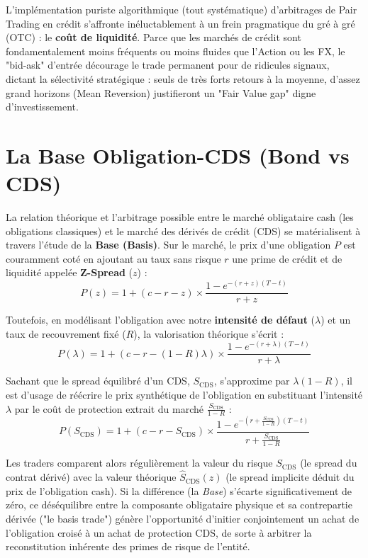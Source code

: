 L'implémentation puriste algorithmique (tout systématique) d'arbitrages de Pair Trading en crédit s'affronte inéluctablement à un frein pragmatique du gré à gré (OTC) : le \textbf{coût de liquidité}. 
Parce que les marchés de crédit sont fondamentalement moins fréquents ou moins fluides que l'Action ou les FX, le "bid-ask" d'entrée décourage le trade permanent pour de ridicules signaux, dictant la sélectivité stratégique : seuls de très forts retours à la moyenne, d'assez grand horizons (Mean Reversion) justifieront un "Fair Value gap" digne d'investissement.

\section{La Base Obligation-CDS (Bond vs CDS)}

La relation théorique et l'arbitrage possible entre le marché obligataire cash (les obligations classiques) et le marché des dérivés de crédit (CDS) se matérialisent à travers l'étude de la \textbf{Base (Basis)}. 
Sur le marché, le prix d'une obligation $P$ est couramment coté en ajoutant au taux sans risque $r$ une prime de crédit et de liquidité appelée \textbf{Z-Spread} ($z$) :
\begin{equation}
    P(z) = 1 + (c - r - z) \times \frac{1 - e^{-(r+z)(T-t)}}{r+z}
\end{equation}

Toutefois, en modélisant l'obligation avec notre \textbf{intensité de défaut} ($\lambda$) et un taux de recouvrement fixé ($R$), la valorisation théorique s'écrit :
\begin{equation}
    P(\lambda) = 1 + \left(c - r - (1-R)\lambda\right) \times \frac{1 - e^{-(r+\lambda)(T-t)}}{r+\lambda}
\end{equation}

Sachant que le spread équilibré d'un CDS, $S_{\text{CDS}}$, s'approxime par $\lambda(1-R)$, il est d'usage de réécrire le prix synthétique de l'obligation en substituant l'intensité $\lambda$ par le coût de protection extrait du marché $\frac{S_{\text{CDS}}}{1-R}$ :
\begin{equation}
    P(S_{\text{CDS}}) = 1 + (c - r - S_{\text{CDS}}) \times \frac{1 - e^{-\left(r+\frac{S_{\text{CDS}}}{1-R}\right)(T-t)}}{r + \frac{S_{\text{CDS}}}{1-R}}
\end{equation}

Les traders comparent alors régulièrement la valeur du risque $S_{\text{CDS}}$ (le spread du contrat dérivé) avec la valeur théorique $\hat{S}_{\text{CDS}}(z)$ (le spread implicite déduit du prix de l'obligation cash). 
Si la différence (la \textit{Base}) s'écarte significativement de zéro, ce déséquilibre entre la composante obligataire physique et sa contrepartie dérivée ("le basis trade") génère l'opportunité d'initier conjointement un achat de l'obligation croisé à un achat de protection CDS, de sorte à arbitrer la reconstitution inhérente des primes de risque de l'entité.


